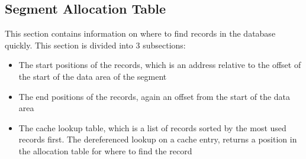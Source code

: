 \documentclass[11pt]{article}
\begin{document}
\subsection{Segment Allocation Table}
This section contains information on where to find records in the database quickly. This section is divided into 3 subsections:
\begin{itemize}
\item The start positions of the records, which is an address relative to the offset of the start of the data area of the segment
\item The end positions of the records, again an offset from the start of the data area
\item The cache lookup table, which is a list of records sorted by the most used records first. The dereferenced lookup on a cache entry, returns a position in the allocation table for where to find the record
\end{itemize}
\end{document}
